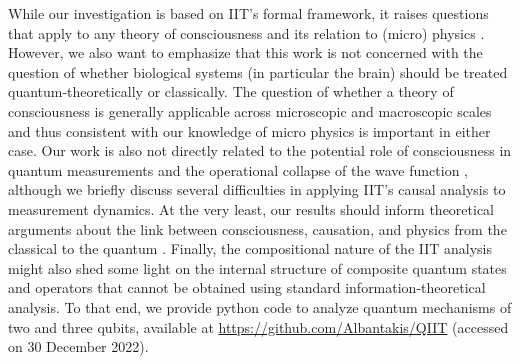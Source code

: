 \documentclass[preprints, article, accept, pdftex, moreauthors, letterpaper]{Definitions/mdpi}
\renewcommand{\=}[1]{\stackrel{#1}{=}} %
\renewcommand{\*}{\otimes}%
\begin{document}

While our investigation is based on IIT's formal framework, it raises questions that apply to any theory of consciousness and its relation to (micro) physics \cite{Tegmark2015,sep-quantum-consciousness,Prakash20}. However, we also want to emphasize that this work is not concerned with the question of whether biological systems (in particular the brain) should be treated quantum-theoretically or classically. The question of whether a theory of consciousness is generally applicable across microscopic and macroscopic scales and thus consistent with our knowledge of micro physics is important in either case. 
Our work is also not directly related to the potential role of consciousness in quantum measurements and the operational collapse of the wave function \cite{wigner1995remarks, Kremnizer2015, Chalmers2021}, although we briefly discuss several difficulties in applying IIT's causal analysis to measurement dynamics. 
At the very least, our results should inform theoretical arguments about the link between consciousness, causation, and physics from the classical to the quantum \cite{Atmanspacher22}. Finally, the compositional nature of the IIT analysis might also shed some light on the internal structure of composite quantum states and operators that cannot be obtained using standard information-theoretical analysis. To that end, we provide python code to analyze quantum mechanisms of two and three qubits, available at \url{https://github.com/Albantakis/QIIT} (accessed on 30 December 2022).
\end{document}
